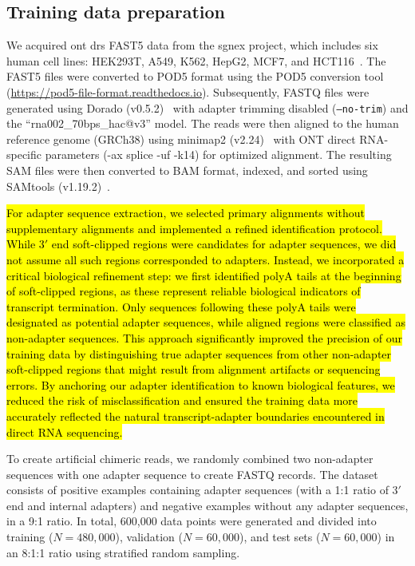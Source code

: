 \documentclass[pdflatex,sn-nature, lineno]{sn-jnl}%
\begin{document}
\subsection{Training data preparation}\label{ssec:data}

We acquired \gls{ont} \gls{drs} FAST5 data from the \gls{sgnex} project, which includes six human cell lines: HEK293T, A549, K562, HepG2, MCF7, and HCT116~\cite{chen2021systematic}.
The FAST5 files were converted to POD5 format using the POD5 conversion tool (\url{https://pod5-file-format.readthedocs.io}).
Subsequently, FASTQ files were generated using Dorado (v0.5.2)~\cite{dorado2023} with adapter trimming disabled (\texttt{--no-trim}) and the ``rna002\_70bps\_hac@v3'' model.
The reads were then aligned to the human reference genome (GRCh38) using minimap2 (v2.24)~\cite{li2018minimap2} with ONT direct RNA-specific parameters (-ax splice -uf -k14) for optimized alignment. The resulting SAM files were then converted to BAM format, indexed, and sorted using SAMtools (v1.19.2)~\cite{li2009sequence}.

\hl{For adapter sequence extraction, we selected primary alignments without supplementary alignments and implemented a refined identification protocol. While $3'$ end soft-clipped regions were candidates for adapter sequences, we did not assume all such regions corresponded to adapters.
	Instead, we incorporated a critical biological refinement step: we first identified polyA tails at the beginning of soft-clipped regions, as these represent reliable biological indicators of transcript termination.
	Only sequences following these polyA tails were designated as potential adapter sequences, while aligned regions were classified as non-adapter sequences.
	This approach significantly improved the precision of our training data by distinguishing true adapter sequences from other non-adapter soft-clipped regions that might result from alignment artifacts or sequencing errors.
	By anchoring our adapter identification to known biological features, we reduced the risk of misclassification and ensured the training data more accurately reflected the natural transcript-adapter boundaries encountered in direct RNA sequencing.}

To create artificial chimeric reads, we randomly combined two non-adapter sequences with one adapter sequence to create FASTQ records.
The dataset consists of positive examples containing adapter sequences (with a 1:1 ratio of $3'$ end and internal adapters) and negative examples without any adapter sequences, in a 9:1 ratio.
In total, 600,000 data points were generated and divided into training ($N=480,000$), validation ($N=60,000$), and test sets ($N=60,000$) in an 8:1:1 ratio using stratified random sampling.
\end{document}
